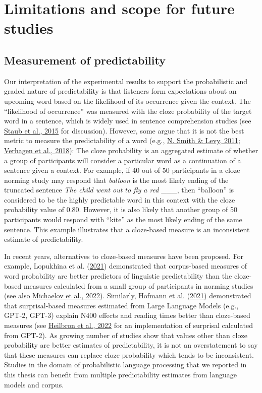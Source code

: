 \documentclass[a4paper, nobind]{templates/ociamthesis}
\begin{document}
\hypertarget{limitations-and-scope-for-future-studies}{%
\section{Limitations and scope for future studies}\label{limitations-and-scope-for-future-studies}}

\hypertarget{measurement-of-predictability}{%
\subsection{Measurement of predictability}\label{measurement-of-predictability}}

Our interpretation of the experimental results to support the probabilistic and graded nature of predictability is that listeners form expectations about an upcoming word based on the likelihood of its occurrence given the context.
The ``likelihood of occurrence'' was measured with the cloze probability of the target word in a sentence,
which is widely used in sentence comprehension studies (see \protect\hyperlink{ref-Staub2015a}{Staub et al., 2015} for discussion).
However, some argue that it is not the best metric to measure the predictability of a word (e.g., \protect\hyperlink{ref-Smith2011}{N. Smith \& Levy, 2011}; \protect\hyperlink{ref-Verhagen2018}{Verhagen et al., 2018}):
The cloze probability is an aggregated estimate of whether a group of participants will consider a particular word as a continuation of a sentence given a context.
For example, if 40 out of 50 participants in a cloze norming study may respond that \emph{balloon} is the most likely ending of the truncated sentence \emph{The child went out to fly a red} \_\_\_,
then ``balloon'' is considered to be the highly predictable word in this context with the cloze probability value of 0.80.
However, it is also likely that another group of 50 participants would respond with ``kite'' as the most likely ending of the same sentence.
This example illustrates that a cloze-based measure is an inconsistent estimate of predictability.

In recent years, alternatives to cloze-based measures have been proposed.
For example, Lopukhina et al. (\protect\hyperlink{ref-Lopukhina2021}{2021}) demonstrated that corpus-based measures of word probability are better predictors of linguistic predictability than the cloze-based measures calculated from a small group of participants in norming studies (see also \protect\hyperlink{ref-Michaelov2022}{Michaelov et al., 2022}).
Similarly, Hofmann et al. (\protect\hyperlink{ref-Hofmann2021}{2021}) demonstrated that surprisal-based measures estimated from Large Language Models (e.g., GPT-2, GPT-3) explain N400 effects and reading times better than cloze-based measures (see \protect\hyperlink{ref-Heilbron2022}{Heilbron et al., 2022} for an implementation of surprisal calculated from GPT-2).
As growing number of studies show that values other than cloze probability are better estimates of predictability,
it is not an overstatement to say that these measures can replace cloze probability which tends to be inconsistent.
Studies in the domain of probabilistic language processing that we reported in this thesis can benefit from multiple predictability estimates from language models and corpus.
\end{document}
